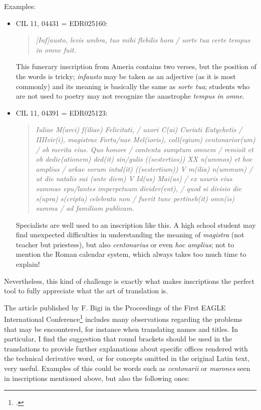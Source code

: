 \documentclass[amsthm,ebook]{saparticle}
\begin{document}
Examples:
\begin{itemize}
\item CIL 11, 04431 = EDR025160: \begin{quotation}
\emph{[Inf]austo, levis umbra, tuo mihi flebilis hora / sorte
tua certe tempus in omne fuit.}

\end{quotation}
This funerary inscription from Ameria contains two verses, but the position of the words is tricky; \emph{infausto} may be
taken as an adjective (as it is most commonly) and its meaning is basically the same as \emph{sorte tua}; students who are not
used to poetry may not recognize the anastrophe \emph{tempus in omne}.

 \item CIL 11, 04391 = EDR025123:\begin{quotation}
\emph{ Iuliae M(arci) f(iliae) Felicitati, / uxori C(ai) Curiati
Eutychetis / IIIIvir(i), magistrae Fortu/nae Mel(ioris), coll(egium) centonarior(um) / ob merita eius. Quo honore /
contenta sumptum omnem / remisit et ob dedic(ationem) ded(it) sin/gulis ((sestertios)) XX n(ummos) et hoc amplius /
arkae eorum intul(it) ((sestertium)) V m(ilia) n(ummum) / ut die natalis sui (ante diem) V Id(us) Mai(as) / ex usuris
eius summae epu/lantes imperpetuum divider(ent), / quod si divisio die s(upra) s(cripta) celebrata non / fuerit tunc
pertineb(it) omn(is) summa / ad familiam publicam. }

\end{quotation}
Specialists are well used to an inscription like this. A high school student may find unexpected difficulties in
understanding the meaning of \emph{magistra} (not teacher but priestess), but also \emph{centonarius} or even \emph{hoc amplius}; not to
mention the Roman calendar system, which always takes too much time to explain!

\end{itemize}

Nevertheless, this kind of challenge is exactly what makes inscriptions the perfect tool to fully appreciate what the
art of translation is.

The article published by F. Bigi in the Proceedings of the First EAGLE International Conference\footnote{\citet{Bigi2014}.}
includes many observations regarding the problems that may be encountered, for instance when translating names and
titles. In particular, I find the suggestion that round brackets should be used in the translations to provide further
explanations about specific offices rendered with the technical derivative word, or for concepts omitted in the
original Latin text, very useful. Examples of this could be words such as \emph{centonarii} or \emph{marones} seen in inscriptions
mentioned above, but also the following ones:
\end{document}
